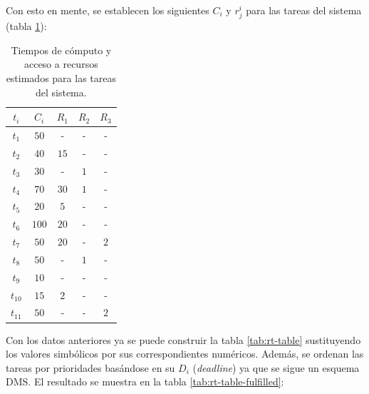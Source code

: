 Con esto en mente, se establecen los siguientes $C_i$ y $r^i_j$ para las tareas del sistema
(tabla \ref{tab:ci-rij}):

\begin{table}[H]
  \centering
  \begin{tabular}{|c|c|c|c|c|}
    \hline
    $t_i$    & $C_i$ & $R_1$ & $R_2$ & $R_3$ \\
    \hline
    $t_1$    & $50$  & -     & -     & -     \\
    $t_2$    & $40$  & $15$  & -     & -     \\
    $t_3$    & $30$  & -     & $1$   & -     \\
    $t_4$    & $70$  & $30$  & $1$   & -     \\
    $t_5$    & $20$  & $5$   & -     & -     \\
    $t_6$    & $100$ & $20$  & -     & -     \\
    $t_7$    & $50$  & $20$  & -     & $2$   \\
    $t_8$    & $50$  & -     & $1$   & -     \\
    $t_9$    & $10$  & -     & -     & -     \\
    $t_{10}$ & $15$  & $2$   & -     & -     \\
    $t_{11}$ & $50$  & -     & -     & $2$   \\
    \hline
  \end{tabular}
  \caption{Tiempos de cómputo y acceso a recursos estimados para las tareas del sistema.}
  \label{tab:ci-rij}
\end{table}

Con los datos anteriores ya se puede construir la tabla \ref{tab:rt-table} sustituyendo
los valores simbólicos por sus correspondientes numéricos. Además, se ordenan las tareas
por prioridades basándose en su $D_i$ (\textit{deadline}) ya que se sigue un esquema
\ac{DMS}. El resultado se muestra en la tabla \ref{tab:rt-table-fulfilled}:

